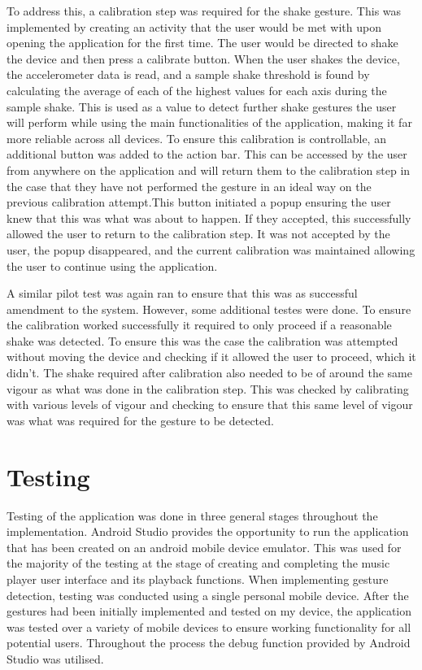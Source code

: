 \documentclass{l4proj}
\begin{document}
To address this, a calibration step was required for the shake gesture. This was implemented by creating an activity that the user would be met with upon opening the application for the first time. The user would be directed to shake the device and then press a calibrate button. When the user shakes the device, the accelerometer data is read, and a sample shake threshold is found by calculating the average of each of the highest values for each axis during the sample shake. This is used as a value to detect further shake gestures the user will perform while using the main functionalities of the application, making it far more reliable across all devices. To ensure this calibration is controllable, an additional button was added to the action bar. This can be accessed by the user from anywhere on the application and will return them to the calibration step in the case that they have not performed the gesture in an ideal way on the previous calibration attempt.This button initiated a popup ensuring the user knew that this was what was about to happen. If they accepted, this successfully allowed the user to return to the calibration step. It was not accepted by the user, the popup disappeared, and the current calibration was maintained allowing the user to continue using the application.

A similar pilot test was again ran to ensure that this was as successful amendment to the system. However, some additional testes were done. To ensure the calibration worked successfully it required to only proceed if a reasonable shake was detected. To ensure this was the case the calibration was attempted without moving the device and checking if it allowed the user to proceed, which it didn't. The shake required after calibration also needed to be of around the same vigour as what was done in the calibration step. This was checked by calibrating with various levels of vigour and checking to ensure that this same level of vigour was what was required for the gesture to be detected.


\section{Testing}

Testing of the application was done in three general stages throughout the implementation. Android Studio provides the opportunity to run the application that has been created on an android mobile device emulator. This was used for the majority of the testing at the stage of creating and completing the music player user interface and its playback functions. When implementing gesture detection, testing was conducted using a single personal mobile device. After the gestures had been initially implemented and tested on my device, the application was tested over a variety of mobile devices to ensure working functionality for all potential users. Throughout the process the debug function provided by Android Studio was utilised.
\end{document}
